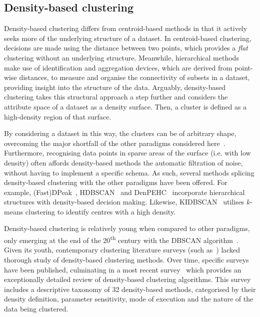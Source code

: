 \subsection{Density-based clustering}

Density-based clustering differs from centroid-based methods in that
it actively seeks more of the underlying structure of a dataset. In
centroid-based clustering, decisions are made using the distance between two
points, which provides a \emph{flat} clustering without an underlying structure.
Meanwhile, hierarchical methods make use of identification and aggregation
devices, which are derived from point-wise distances, to measure and organise
the connectivity of subsets in a dataset, providing insight into the structure
of the data. Arguably, density-based clustering takes this structural approach a
step further and considers the attribute space of a dataset as a density
surface. Then, a cluster is defined as a high-density region of that surface.

By considering a dataset in this way, the clusters can be of arbitrary shape,
overcoming the major shortfall of the other paradigms considered
here~\cite{Raykov2016}. Furthermore, recognising data points in sparse areas of
the surface (i.e. with low density) often affords density-based methods the
automatic filtration of noise, without having to implement a specific schema. As
such, several methods splicing density-based clustering with the other paradigms
have been offered. For example, (Fast)DPeak~\cite{Chen2020},
HDBSCAN~\cite{Campello2013} and DenPEHC~\cite{Xu2016} incorporate hierarchical
structures with density-based decision making. Likewise,
KIDBSCAN~\cite{Tsai2006} utilises \(k\)-means clustering to identify centres
with a high density.

Density-based clustering is relatively young when compared to other paradigms,
only emerging at the end of the 20\textsuperscript{th} century with the DBSCAN
algorithm~\cite{Ester1996}. Given its youth, contemporary clustering literature
surveys (such as~\cite{Jain1999,Xu2005}) lacked thorough study of density-based
clustering methods. Over time, specific surveys have been published, culminating
in a most recent survey~\cite{Bhattacharjee2020} which provides an exceptionally
detailed review of density-based clustering algorithms. This survey includes a
descriptive taxonomy of 32 density-based methods, categorised by their density
definition, parameter sensitivity, mode of execution and the nature of the data
being clustered.

